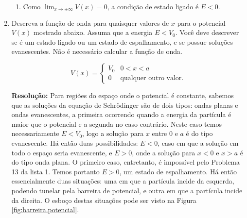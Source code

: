 \documentclass[a4paper, 12pt, notitlepage]{article}
\begin{document}
\begin{enumerate}
\begin{enumerate}
    \item Como $\lim_{x \to \pm \infty} V(x) = 0$, a condição de estado ligado é $E < 0$.
    
  \end{enumerate}

\item Descreva a função de onda para quaisquer valores de $x$ para o potencial $V(x)$ mostrado abaixo. Assuma que a energia $E < V_0$. Você deve descrever se é um estado ligado ou um estado de espalhamento, e se possue soluções evanescentes. Não é necessário calcular a função de onda.

  \begin{equation*}
    V(x) = \begin{cases} V_0 & 0 < x < a\\ 0 & \text{qualquer outro valor.} \end{cases}
  \end{equation*}

\textbf{Resolução: }
  Para regiões do espaço onde o potencial é constante, sabemos que as soluções da equação de Schrödinger são de dois tipos: ondas planas e ondas evanescentes, a primeira ocorrendo quando a energia da partícula é maior que o potencial e a segunda no caso contrário. Neste caso temos necessariamente $E < V_0$, logo a solução para $x$ entre $0$ e $a$ é do tipo evanescente. Há então duas possibilidades: $E < 0$, caso em que a solução em todo o espaço seria evanescente, e $E > 0$, onde a solução para $x < 0$ e $x > a$ é do tipo onda plana. O primeiro caso, entretanto, é impossível pelo Problema 13 da lista 1. Temos portanto $E > 0$, um estado de espalhamento. Há então essencialmente duas situações: uma em que a partícula incide da esquerda, podendo tunelar pela barreira de potencial, e outra em que a partícula incide da direita. O esboço destas situações pode ser visto na Figura \ref{fig:barreira.potencial}.


\end{enumerate}
\end{document}
